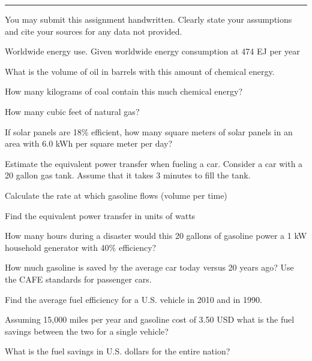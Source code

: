 \documentclass{article}
\begin{document}
\hrule
\vspace{10pt}





You may submit this assignment handwritten.  Clearly state your
assumptions and cite your sources for any data not provided.


\problem{}

Worldwide energy use.  Given worldwide energy consumption at 474 EJ
   per year

\subproblem What is the volume of oil in barrels with this amount of chemical
        energy.

\subproblem How many kilograms of coal contain this much chemical energy?

\subproblem How many cubic feet of natural gas?

\subproblem If solar panels are 18\% efficient, how many square meters of
    solar panels in an area with 6.0 kWh per square meter per day?


\problem{} Estimate the equivalent power transfer when fueling a car.  Consider
a car with a 20 gallon gas tank.  Assume that it takes 3 minutes to fill
the tank.

\subproblem Calculate the rate at which gasoline flows (volume per time)

\subproblem Find the equivalent power transfer in units of watts

\subproblem How many hours during a disaster would this 20 gallons of
    gasoline power a 1 kW household generator with 40\% efficiency?



\problem{} How much gasoline is saved by the average car today versus 20 years
ago?  Use the CAFE standards for passenger cars.

\subproblem Find the average fuel efficiency for a U.S. vehicle in 2010 and
    in 1990.

\subproblem Assuming 15,000 miles per year and gasoline cost of 3.50 USD what
    is the fuel savings between the two for a single vehicle?

\subproblem What is the fuel savings in U.S. dollars for the entire nation?
\end{document}

